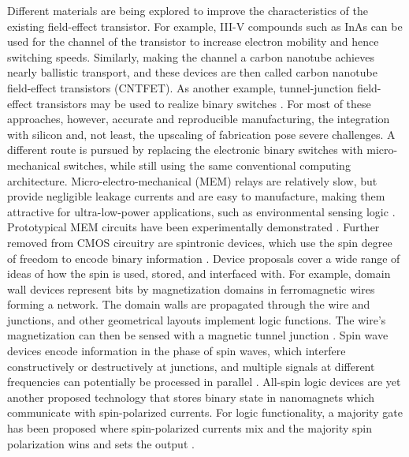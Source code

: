 Different materials are being explored to improve the characteristics of the
existing field-effect transistor. For example, III-V compounds such as InAs can
be used for the channel of the transistor to increase electron mobility and
hence switching speeds. Similarly, making the channel a carbon nanotube achieves
nearly ballistic transport, and these devices are then called carbon nanotube
field-effect transistors (CNTFET). As another example, tunnel-junction
field-effect transistors may be used to realize binary switches
\cite{nikonov2013overview} \cite{cavin2012science}. For most of these
approaches, however, accurate and reproducible manufacturing, the integration
with silicon and, not least, the upscaling of fabrication pose severe
challenges. A different route is pursued by replacing the electronic binary
switches with micro-mechanical switches, while still using the same conventional
computing architecture. Micro-electro-mechanical (MEM) relays are relatively
slow, but provide negligible leakage currents and are easy to manufacture,
making them attractive for ultra-low-power applications, such as environmental
sensing logic \cite{kam2011design}. Prototypical MEM circuits have been
experimentally demonstrated \cite{spencer2011demonstration}. Further removed
from CMOS circuitry are spintronic devices, which use the spin degree of freedom
to encode binary information \cite{wolf2001spintronics}. Device proposals cover
a wide range of ideas of how the spin is used, stored, and interfaced with. For
example, domain wall devices represent bits by magnetization domains in
ferromagnetic wires forming a network. The domain walls are propagated through
the wire and junctions, and other geometrical layouts implement logic functions.
The wire's magnetization can then be sensed with a magnetic tunnel junction
\cite{allwood2005magnetic}. Spin wave devices encode information in the phase of
spin waves, which interfere constructively or destructively at junctions, and
multiple signals at different frequencies can potentially be processed in
parallel \cite{khitun2005nano} \cite{kostylev2005spin}. All-spin logic devices
are yet another proposed technology that stores binary state in nanomagnets
which communicate with spin-polarized currents. For logic functionality, a
majority gate has been proposed where spin-polarized currents mix and the
majority spin polarization wins and sets the output \cite{behin2010proposal}
\cite{srinivasan2011all}. 


